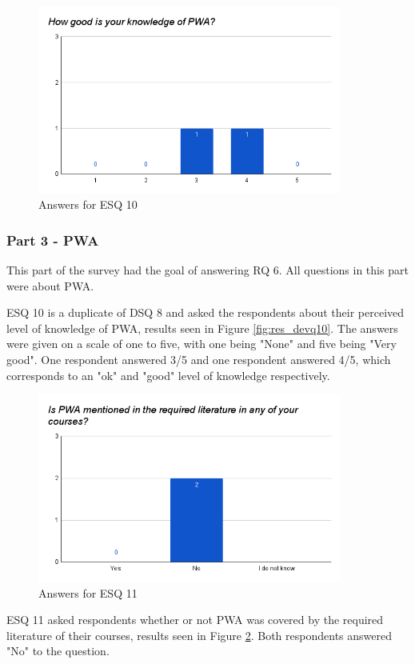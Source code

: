 \documentclass[a4paper,12pt]{article}
\begin{document}
\begin{figure}[ht!]
    \centering
    \includegraphics[width=10cm]{img/Results/esq10.png}
    \caption{Answers for ESQ 10}
    \label{fig:res_eduq10}
\end{figure}

\subsubsection{Part 3 - PWA}
\label{Results_edu_part3}
This part of the survey had the goal of answering RQ 6. All questions in this part were about PWA.

ESQ 10 is a duplicate of DSQ 8 and asked the respondents about their perceived level of knowledge of PWA, results seen in Figure \ref{fig:res_devq10}. The answers were given on a scale of one to five, with one being "None" and five being "Very good". One respondent answered 3/5 and one respondent answered 4/5, which corresponds to an "ok" and "good" level of knowledge respectively.

\begin{figure}[ht!]
    \centering
    \includegraphics[width=10cm]{img/Results/esq11.png}
    \caption{Answers for ESQ 11}
    \label{fig:res_eduq11}
\end{figure}

ESQ 11 asked respondents whether or not PWA was covered by the required literature of their courses, results seen in Figure \ref{fig:res_eduq11}. Both respondents answered "No" to the question.
\end{document}
